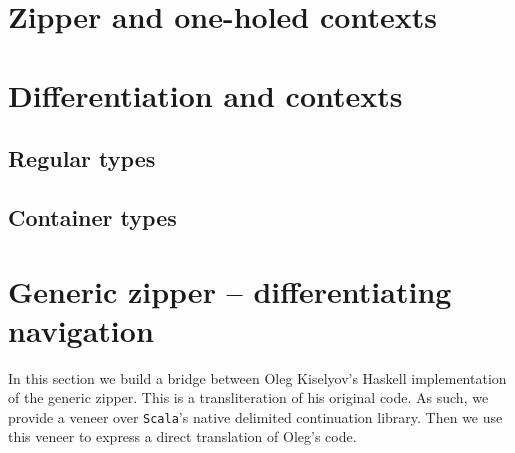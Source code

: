 \section{Zipper and one-holed contexts}

\section{Differentiation and contexts}

\subsection{Regular types}

\subsection{Container types}

\section{Generic zipper -- differentiating navigation}

In this section we build a bridge between Oleg Kiselyov's Haskell
implementation of the generic zipper. This is a transliteration of his
original code. As such, we provide a veneer over \texttt{Scala}'s
native delimited continuation library. Then we use this veneer to
express a direct translation of Oleg's code.

